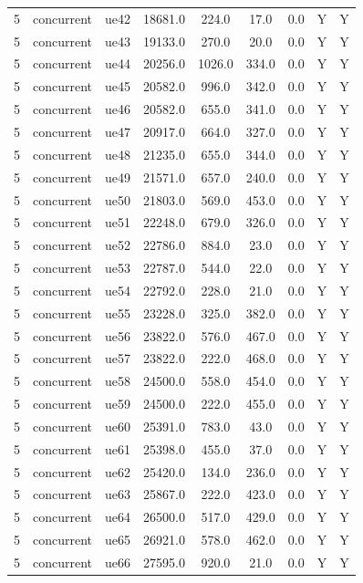 \begin{table}[ht]
\begin{tabular}{|c|c|c|c|c|c|c|c|c|}
5 & concurrent & ue42 & 18681.0 & 224.0 & 17.0 & 0.0 & Y & Y \\
5 & concurrent & ue43 & 19133.0 & 270.0 & 20.0 & 0.0 & Y & Y \\
5 & concurrent & ue44 & 20256.0 & 1026.0 & 334.0 & 0.0 & Y & Y \\
5 & concurrent & ue45 & 20582.0 & 996.0 & 342.0 & 0.0 & Y & Y \\
5 & concurrent & ue46 & 20582.0 & 655.0 & 341.0 & 0.0 & Y & Y \\
5 & concurrent & ue47 & 20917.0 & 664.0 & 327.0 & 0.0 & Y & Y \\
5 & concurrent & ue48 & 21235.0 & 655.0 & 344.0 & 0.0 & Y & Y \\
5 & concurrent & ue49 & 21571.0 & 657.0 & 240.0 & 0.0 & Y & Y \\
5 & concurrent & ue50 & 21803.0 & 569.0 & 453.0 & 0.0 & Y & Y \\
5 & concurrent & ue51 & 22248.0 & 679.0 & 326.0 & 0.0 & Y & Y \\
5 & concurrent & ue52 & 22786.0 & 884.0 & 23.0 & 0.0 & Y & Y \\
5 & concurrent & ue53 & 22787.0 & 544.0 & 22.0 & 0.0 & Y & Y \\
5 & concurrent & ue54 & 22792.0 & 228.0 & 21.0 & 0.0 & Y & Y \\
5 & concurrent & ue55 & 23228.0 & 325.0 & 382.0 & 0.0 & Y & Y \\
5 & concurrent & ue56 & 23822.0 & 576.0 & 467.0 & 0.0 & Y & Y \\
5 & concurrent & ue57 & 23822.0 & 222.0 & 468.0 & 0.0 & Y & Y \\
5 & concurrent & ue58 & 24500.0 & 558.0 & 454.0 & 0.0 & Y & Y \\
5 & concurrent & ue59 & 24500.0 & 222.0 & 455.0 & 0.0 & Y & Y \\
5 & concurrent & ue60 & 25391.0 & 783.0 & 43.0 & 0.0 & Y & Y \\
5 & concurrent & ue61 & 25398.0 & 455.0 & 37.0 & 0.0 & Y & Y \\
5 & concurrent & ue62 & 25420.0 & 134.0 & 236.0 & 0.0 & Y & Y \\
5 & concurrent & ue63 & 25867.0 & 222.0 & 423.0 & 0.0 & Y & Y \\
5 & concurrent & ue64 & 26500.0 & 517.0 & 429.0 & 0.0 & Y & Y \\
5 & concurrent & ue65 & 26921.0 & 578.0 & 462.0 & 0.0 & Y & Y \\
5 & concurrent & ue66 & 27595.0 & 920.0 & 21.0 & 0.0 & Y & Y \\

\end{tabular}
\end{table}
